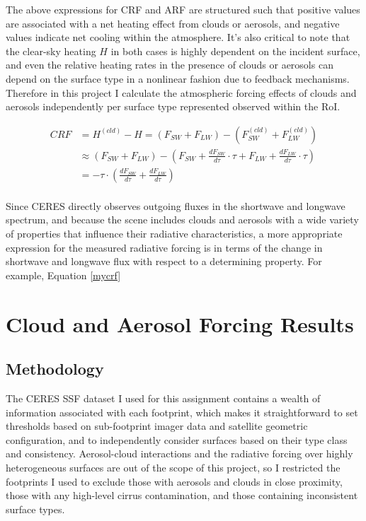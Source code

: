 \documentclass[12pt]{article}
\begin{document}
    The above expressions for CRF and ARF are structured such that positive values are associated with a net heating effect from clouds or aerosols, and negative values indicate net cooling within the atmosphere. It's also critical to note that the clear-sky heating $H$ in both cases is highly dependent on the incident surface, and even the relative heating rates in the presence of clouds or aerosols can depend on the surface type in a nonlinear fashion due to feedback mechanisms. Therefore in this project I calculate the atmospheric forcing effects of clouds and aerosols independently per surface type represented observed within the RoI.

    \begin{equation}\label{mycrf}
        \begin{split}
            CRF
            &= H^{(cld)} - H = (F_{SW}+F_{LW}) - (F_{SW}^{(cld)} + F_{LW}^{(cld)}) \\
            &\approx (F_{SW}+F_{LW}) - \left(F_{SW} + \frac{dF_{SW}}{d\tau}\cdot \tau + F_{LW} + \frac{dF_{LW}}{d\tau} \cdot \tau\right) \\
            &= -\tau \cdot \left(\frac{dF_{SW}}{d\tau} + \frac{dF_{LW}}{d\tau}\right)\\
        \end{split}
    \end{equation}

    Since CERES directly observes outgoing fluxes in the shortwave and longwave spectrum, and because the scene includes clouds and aerosols with a wide variety of properties that influence their radiative characteristics, a more appropriate expression for the measured radiative forcing is in terms of the change in shortwave and longwave flux with respect to a determining property. For example, Equation \ref{mycrf}

    \section{Cloud and Aerosol Forcing Results}

    \subsection{Methodology}

    The CERES SSF dataset I used for this assignment contains a wealth of information associated with each footprint, which makes it straightforward to set thresholds based on sub-footprint imager data and satellite geometric configuration, and to independently consider surfaces based on their type class and consistency. Aerosol-cloud interactions and the radiative forcing over highly heterogeneous surfaces are out of the scope of this project, so I restricted the footprints I used to exclude those with aerosols and clouds in close proximity, those with any high-level cirrus contamination, and those containing inconsistent surface types.
\end{document}
